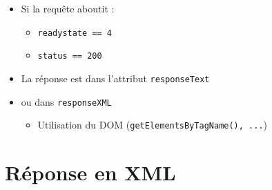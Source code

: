 \begin{itemize}
\tightlist
\item
  Si la requête aboutit :

  \begin{itemize}
  \tightlist
  \item
    \textenglish{\texttt{readystate\ ==\ 4}}
  \item
    \textenglish{\texttt{status\ ==\ 200}}
  \end{itemize}
\item
  La réponse est dans l'attribut \textenglish{\texttt{responseText}}
\item
  ou dans \textenglish{\texttt{responseXML}}

  \begin{itemize}
  \tightlist
  \item
    Utilisation du DOM
    (\textenglish{\texttt{getElementsByTagName(),\ ...}})
  \end{itemize}
\end{itemize}

\hypertarget{ruxe9ponse-en-xml}{%
\section{Réponse en XML}\label{ruxe9ponse-en-xml}}

\begin{english}

\begin{Shaded}
\begin{Highlighting}[]
\end{Highlighting}
\end{Shaded}

\end{english}

